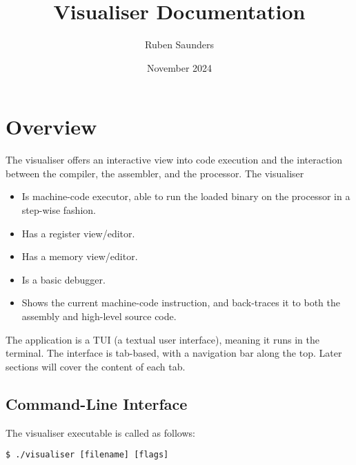 \documentclass[10pt]{article}
\title{Visualiser Documentation}
\author{Ruben Saunders}
\date{November 2024}
\begin{document}
    \maketitle
    \tableofcontents

    \newpage

    \section{Overview}

    The visualiser offers an interactive view into code execution and the interaction between the compiler, the assembler, and the processor.
    The visualiser
    \begin{itemize}
        \item Is machine-code executor, able to run the loaded binary on the processor in a step-wise fashion.
        \item Has a register view/editor.
        \item Has a memory view/editor.
        \item Is a basic debugger.
        \item Shows the current machine-code instruction, and back-traces it to both the assembly and high-level source code.
    \end{itemize}

    The application is a TUI (a textual user interface), meaning it runs in the terminal.
    The interface is tab-based, with a navigation bar along the top.
    Later sections will cover the content of each tab.

    \subsection{Command-Line Interface}

    The visualiser executable is called as follows:

    \medskip
    \begin{lstlisting}[style=bashconsole]
$ ./visualiser [filename] [flags]
    \end{lstlisting}
\end{document}
